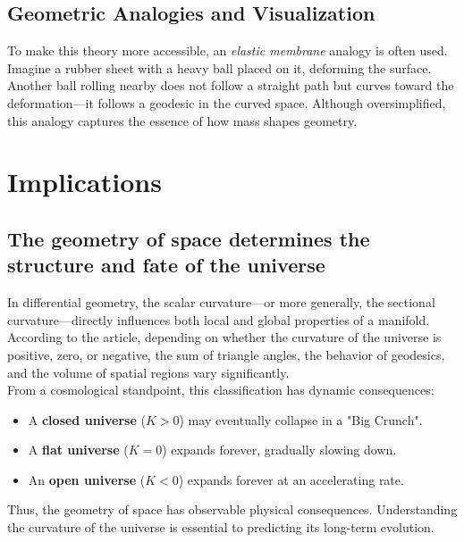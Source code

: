 \documentclass{aleph-revista}
\begin{document}
\subsection*{Geometric Analogies and Visualization}
To make this theory more accessible, an \textit{elastic membrane} analogy is often used. Imagine a rubber sheet with a heavy ball placed on it, deforming the surface. Another ball rolling nearby does not follow a straight path but curves toward the deformation—it follows a geodesic in the curved space. Although oversimplified, this analogy captures the essence of how mass shapes geometry.
\section{Implications}
\subsection*{The geometry of space determines the structure and fate of the universe}
In differential geometry, the scalar curvature—or more generally, the sectional curvature—directly influences both local and global properties of a manifold. According to the article, depending on whether the curvature of the universe is positive, zero, or negative, the sum of triangle angles, the behavior of geodesics, and the volume of spatial regions vary significantly.\\
From a cosmological standpoint, this classification has dynamic consequences:
\begin{itemize}
  \item A \textbf{closed universe} ($K > 0$) may eventually collapse in a "Big Crunch".
  \item A \textbf{flat universe} ($K = 0$) expands forever, gradually slowing down.
  \item An \textbf{open universe} ($K < 0$) expands forever at an accelerating rate.
\end{itemize}
Thus, the geometry of space has observable physical consequences. Understanding the curvature of the universe is essential to predicting its long-term evolution.
\end{document}
